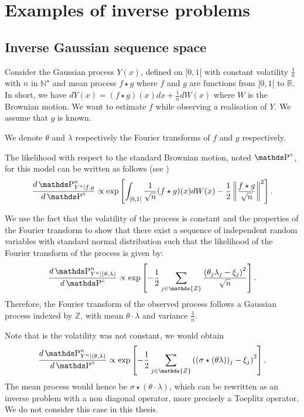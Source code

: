 \section{Examples of inverse problems}\label{1.4}

\subsection{Inverse Gaussian sequence space}\label{1.4.1}
Consider the Gaussian process $Y(x)$, defined on $[0, 1[$ with constant volatility $\frac{1}{n}$ with $n$ in $\mathds{N}^{\star}$ and mean process $f \star g$ where $f$ and $g$ are functions from $[0, 1[$ to $\mathds{R}$.
In short, we have $dY(x) = (f \star g)(x) dx + \frac{1}{n} dW(x)$ where $W$ is the Brownian motion.
We want to estimate $f$ while observing a realisation of $Y$.
We assume that $g$ is known.



We denote $\theta$ and $\lambda$ respectively the Fourier transforms of $f$ and $g$ respectively.

The likelihood with respect to the standard Brownian motion, noted $\P^{\circ}$, for this model can be written as follows (see )
\[\frac{d \P_{Y^{n} \vert f, g}^{n}}{d \P^{\circ}} \propto \exp\left[\int_{[0, 1[} \frac{1}{\sqrt{n}} (f \star g)(x) dW(x) - \frac{1}{2} \left\Vert \frac{f \star g}{\sqrt{n}} \right\Vert^{2}\right].\]

We use the fact that the volatility of the process is constant and the properties of the Fourier transform to show that there exist a sequence of independent random variables with standard normal distribution such that the likelihood of the Fourier transform of the process is given by:
\[\frac{d\P^{n}_{Y^{n} \vert (\theta, \lambda)}}{d \P^{\circ}} \propto \exp\left[ -\frac{1}{2}\sum\limits_{j \in \mathds{Z}} \frac{\left(\theta_{j} \lambda_{j} - \xi_{j}\right)^{2}}{\sqrt{n}}\right].\]
Therefore, the Fourier transform of the observed process follows a Gaussian process indexed by $\mathds{Z}$, with mean $\theta \cdot \lambda$ and variance $\frac{1}{n}$.

Note that is the volatility was not constant, we would obtain
\[\frac{d\P^{n}_{Y^{n} \vert (\theta, \lambda)}}{d \P^{\circ}} \propto \exp\left[ -\frac{1}{2}\sum\limits_{j \in \mathds{Z}} \left((\sigma \star (\theta \lambda))_{j} - \xi_{j}\right)^{2}\right].\]
The mean process would hence be $\sigma \star (\theta \cdot \lambda)$, which can be rewritten as an inverse problem with a non diagonal operator, more precisely a Toeplitz operator.
We do not consider this case in this thesis.

